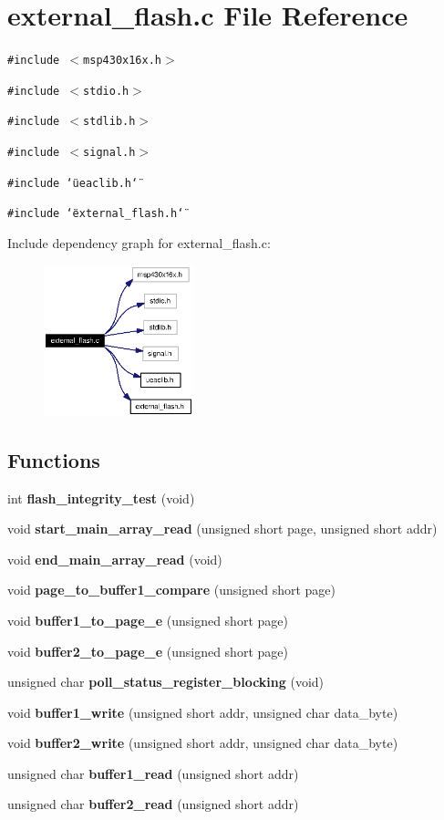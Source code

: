 \section{external\_\-flash.c File Reference}
\label{external__flash_8c}
{\tt \#include $<$msp430x16x.h$>$}\par
{\tt \#include $<$stdio.h$>$}\par
{\tt \#include $<$stdlib.h$>$}\par
{\tt \#include $<$signal.h$>$}\par
{\tt \#include \char`\"{}ueaclib.h\char`\"{}}\par
{\tt \#include \char`\"{}external\_\-flash.h\char`\"{}}\par


Include dependency graph for external\_\-flash.c:\begin{figure}[H]
\begin{center}
\leavevmode
\includegraphics[width=123pt]{external__flash_8c__incl}
\end{center}
\end{figure}
\subsection*{Functions}
\begin{CompactItemize}
\item 
int {\bf flash\_\-integrity\_\-test} (void)
\item 
void {\bf start\_\-main\_\-array\_\-read} (unsigned short page, unsigned short addr)
\item 
void {\bf end\_\-main\_\-array\_\-read} (void)
\item 
void {\bf page\_\-to\_\-buffer1\_\-compare} (unsigned short page)
\item 
void {\bf buffer1\_\-to\_\-page\_\-e} (unsigned short page)
\item 
void {\bf buffer2\_\-to\_\-page\_\-e} (unsigned short page)
\item 
unsigned char {\bf poll\_\-status\_\-register\_\-blocking} (void)
\item 
void {\bf buffer1\_\-write} (unsigned short addr, unsigned char data\_\-byte)
\item 
void {\bf buffer2\_\-write} (unsigned short addr, unsigned char data\_\-byte)
\item 
unsigned char {\bf buffer1\_\-read} (unsigned short addr)
\item 
unsigned char {\bf buffer2\_\-read} (unsigned short addr)
\end{CompactItemize}


